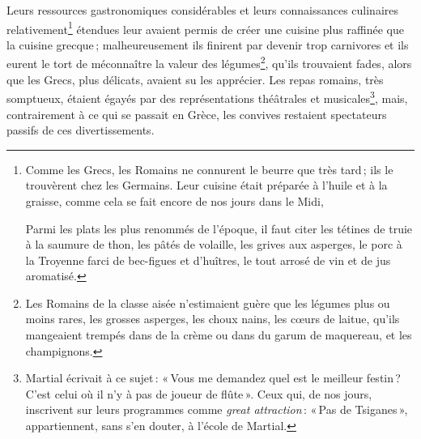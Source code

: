 Leurs ressources gastronomiques considérables et leurs connaissances culinaires
relativement\footnote{ Comme les Grecs, les Romains ne connurent le beurre que très
tard ; ils le trouvèrent chez les Germains. Leur cuisine était préparée
à l'huile et à la graisse, comme cela se fait encore de nos jours dans le Midi,

Parmi les plats les plus renommés de l’époque, il faut citer les tétines de
truie à la saumure de thon, les pâtés de volaille, les grives aux asperges, le
porc à la Troyenne farci de bec-figues et d'huîtres, le tout arrosé de vin et
de jus aromatisé.} étendues leur avaient permis de créer une cuisine plus
raffinée que la cuisine grecque ; malheureusement ils finirent par devenir trop
carnivores et ils eurent le tort de méconnaître la valeur des
légumes\footnote{Les Romains de la classe aisée n'estimaient guère que les
légumes plus ou moins rares, les grosses asperges, les choux nains, les cœurs
de laitue, qu'ils mangeaient trempés dans de la crème ou dans du garum de
maquereau, et les champignons.}, qu'ils trouvaient fades, alors que les Grecs,
plus délicats, avaient su les apprécier. Les repas romains, très somptueux,
étaient égayés par des représentations théâtrales et musicales\footnote{Martial
écrivait à ce sujet : « Vous me demandez quel est le meilleur festin ? C'est
celui où il n'y à pas de joueur de flûte ». Ceux qui, de nos jours, inscrivent
sur leurs programmes comme \textit{great attraction} : « Pas de Tsiganes »,
appartiennent, sans s'en douter, à l'école de Martial.}, mais, contrairement
à ce qui se passait en Grèce, les convives restaient spectateurs passifs de ces
divertissements.

